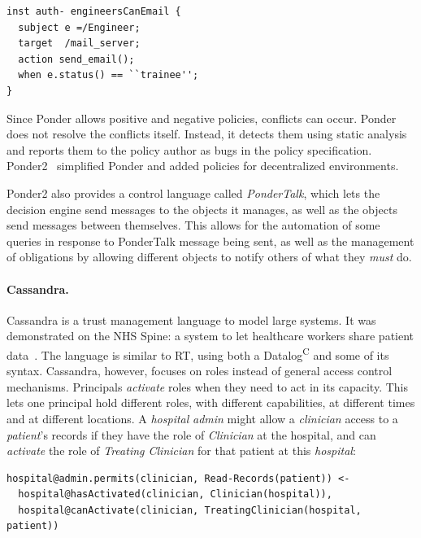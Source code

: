 \documentclass[thesis.tex]{subfiles}
\begin{document}
\begin{lstlisting}
inst auth- engineersCanEmail {
  subject e =/Engineer;
  target  /mail_server;
  action send_email();
  when e.status() == ``trainee'';
}
\end{lstlisting}

Since Ponder allows positive and negative policies, conflicts can occur. Ponder
does not resolve the conflicts itself. Instead, it detects them using static
analysis and reports them to the policy author as bugs in the policy
specification. Ponder2~\cite{twidle_ponder2:_2009} simplified Ponder and added
policies for decentralized environments. 

Ponder2 also provides a control language called \emph{PonderTalk}, which lets
the decision engine send messages to the objects it manages, as well as the
objects send messages between themselves. This allows for the automation of some
queries in response to PonderTalk message being sent, as well as the management
of obligations by allowing different objects to notify others of what they
\emph{must} do.


\paragraph*{Cassandra.}
Cassandra is a trust management language to model large systems.
It was demonstrated on the NHS Spine: a system to let healthcare
workers share patient
data~\cite{becker_cassandra:_2004,becker_cassandra:_2004-1}.  The
language is similar to RT, using both a Datalog\textsuperscript{C} and some
of its syntax. Cassandra, however, focuses on roles instead of general access
control mechanisms.  Principals \emph{activate} roles when they need to act in its
capacity.  This lets one principal hold different roles, with
different capabilities, at different times and at different
locations.  A \emph{hospital} \emph{admin} might allow a
\emph{clinician} access to a \emph{patient}'s records if they
have the role of \emph{Clinician} at the hospital, and can
\emph{activate} the role of \emph{Treating Clinician} for that patient
at this \emph{hospital}:

\noindent\begin{minipage}{\textwidth}
\begin{lstlisting}
hospital@admin.permits(clinician, Read-Records(patient)) <-
  hospital@hasActivated(clinician, Clinician(hospital)),
  hospital@canActivate(clinician, TreatingClinician(hospital, patient))
\end{lstlisting}
\end{minipage}
\end{document}
